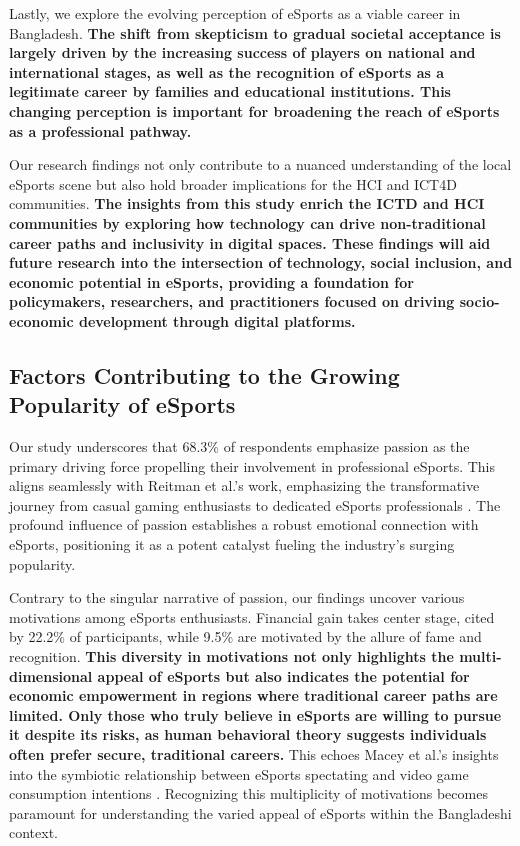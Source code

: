 \documentclass[manuscript,screen,review,anonymous]{acmart}
\begin{document}
Lastly, we explore the evolving perception of eSports as a viable career in Bangladesh. \textbf{The shift from skepticism to gradual societal acceptance is largely driven by the increasing success of players on national and international stages, as well as the recognition of eSports as a legitimate career by families and educational institutions. This changing perception is important for broadening the reach of eSports as a professional pathway.}

Our research findings not only contribute to a nuanced understanding of the local eSports scene but also hold broader implications for the HCI and ICT4D communities. \textbf{The insights from this study enrich the ICTD and HCI communities by exploring how technology can drive non-traditional career paths and inclusivity in digital spaces. These findings will aid future research into the intersection of technology, social inclusion, and economic potential in eSports, providing a foundation for policymakers, researchers, and practitioners focused on driving socio-economic development through digital platforms.}

\subsection {Factors Contributing to the Growing Popularity of eSports} 
Our study underscores that 68.3\% of respondents emphasize passion as the primary driving force propelling their involvement in professional eSports. This aligns seamlessly with Reitman et al.'s work, emphasizing the transformative journey from casual gaming enthusiasts to dedicated eSports professionals \cite{a19}. The profound influence of passion establishes a robust emotional connection with eSports, positioning it as a potent catalyst fueling the industry's surging popularity.

Contrary to the singular narrative of passion, our findings uncover various motivations among eSports enthusiasts. Financial gain takes center stage, cited by 22.2\% of participants, while 9.5\% are motivated by the allure of fame and recognition. \textbf{This diversity in motivations not only highlights the multi-dimensional appeal of eSports but also indicates the potential for economic empowerment in regions where traditional career paths are limited. Only those who truly believe in eSports are willing to pursue it despite its risks, as human behavioral theory suggests individuals often prefer secure, traditional careers.} This echoes Macey et al.'s insights into the symbiotic relationship between eSports spectating and video game consumption intentions \cite{a11}. Recognizing this multiplicity of motivations becomes paramount for understanding the varied appeal of eSports within the Bangladeshi context.
\end{document}
